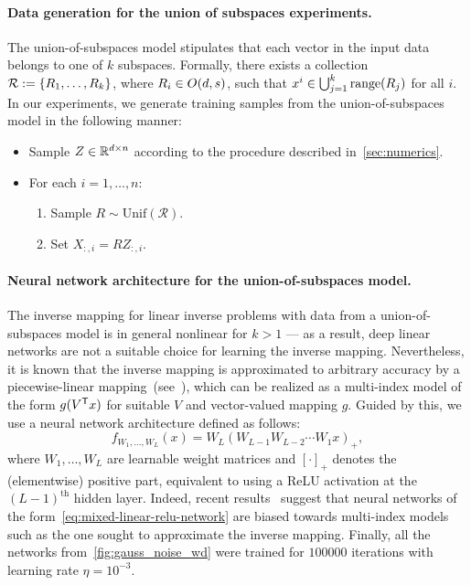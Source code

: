 \paragraph{Data generation for the union of subspaces experiments.}
The union-of-subspaces model stipulates that each vector in the input
data belongs to one of $k$ subspaces. Formally, there exists a
collection $\mathcal{R} := \{R_1, \dots, R_k\}$, where $R_{i} \in O(d, s)$,
such that $x^{i} \in \bigcup_{j = 1}^k \mathrm{range}(R_{j})$ for all $i$.
In our experiments, we generate training samples from the union-of-subspaces model in the following manner:
\begin{itemize}
    \item Sample $Z \in \mathbb{R}^{d \times n}$ according to
    the procedure described in~\cref{sec:numerics}.
    \item For each $i = 1, \dots, n$:
    \begin{enumerate}
        \item Sample $R \sim \mathrm{Unif}(\mathcal{R})$.
        \item Set $X_{:, i} = R Z_{:, i}$.
    \end{enumerate}
\end{itemize}

\paragraph{Neural network architecture for the union-of-subspaces model.}
The inverse mapping for linear inverse problems with data from a union-of-subspaces model is in general nonlinear for $k > 1$ --- as
a result, deep linear networks are not a suitable choice for learning
the inverse mapping.
Nevertheless, it is known that the inverse mapping is approximated to arbitrary accuracy
by a piecewise-linear mapping~(see~\cite{GOW20}), which can be realized as a multi-index model of the form $g(V^{\mathsf{T}} x)$ for
suitable $V$ and vector-valued mapping $g$. Guided by this, we use a
neural network architecture defined as follows:
\begin{equation}
    f_{W_1, \dots, W_L}(x) =
    W_L \left( W_{L-1} W_{L-2} \cdots W_{1} x\right)_+,
    \label{eq:mixed-linear-relu-network}
\end{equation}
where $W_1, \dots, W_{L}$ are learnable weight matrices and
$[\cdot]_+$ denotes the (elementwise) positive part, equivalent to using a ReLU activation at the $(L-1)^{\text{th}}$ hidden layer.
Indeed, recent results~\cite{parkinson2023linear} suggest that neural
networks of the form~\eqref{eq:mixed-linear-relu-network} are biased
towards multi-index models such as the one sought to approximate the
inverse mapping. Finally, all the networks from~\cref{fig:gauss_noise_wd} were trained for $100000$ iterations
with learning rate $\eta = 10^{-3}$.


